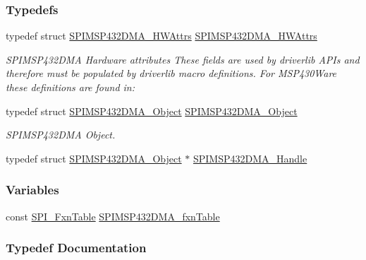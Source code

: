\subsubsection*{Typedefs}
\begin{DoxyCompactItemize}
\item 
typedef struct \hyperlink{struct_s_p_i_m_s_p432_d_m_a___h_w_attrs}{S\+P\+I\+M\+S\+P432\+D\+M\+A\+\_\+\+H\+W\+Attrs} \hyperlink{_s_p_i_m_s_p432_d_m_a_8h_a3c134f41d4b331c52e9689b1fa4df451}{S\+P\+I\+M\+S\+P432\+D\+M\+A\+\_\+\+H\+W\+Attrs}
\begin{DoxyCompactList}\small\item\em S\+P\+I\+M\+S\+P432\+D\+M\+A Hardware attributes These fields are used by driverlib A\+P\+Is and therefore must be populated by driverlib macro definitions. For M\+S\+P430\+Ware these definitions are found in\+: \end{DoxyCompactList}\item 
typedef struct \hyperlink{struct_s_p_i_m_s_p432_d_m_a___object}{S\+P\+I\+M\+S\+P432\+D\+M\+A\+\_\+\+Object} \hyperlink{_s_p_i_m_s_p432_d_m_a_8h_a8ace92c08f232b6bf494eaf2636f5f40}{S\+P\+I\+M\+S\+P432\+D\+M\+A\+\_\+\+Object}
\begin{DoxyCompactList}\small\item\em S\+P\+I\+M\+S\+P432\+D\+M\+A Object. \end{DoxyCompactList}\item 
typedef struct \hyperlink{struct_s_p_i_m_s_p432_d_m_a___object}{S\+P\+I\+M\+S\+P432\+D\+M\+A\+\_\+\+Object} $\ast$ \hyperlink{_s_p_i_m_s_p432_d_m_a_8h_ad9225ceabbfa997521f48546a58b0e1d}{S\+P\+I\+M\+S\+P432\+D\+M\+A\+\_\+\+Handle}
\end{DoxyCompactItemize}
\subsubsection*{Variables}
\begin{DoxyCompactItemize}
\item 
const \hyperlink{struct_s_p_i___fxn_table}{S\+P\+I\+\_\+\+Fxn\+Table} \hyperlink{_s_p_i_m_s_p432_d_m_a_8h_aee524b32bcdc37f4035099dff00abbc2}{S\+P\+I\+M\+S\+P432\+D\+M\+A\+\_\+fxn\+Table}
\end{DoxyCompactItemize}


\subsubsection{Typedef Documentation}
